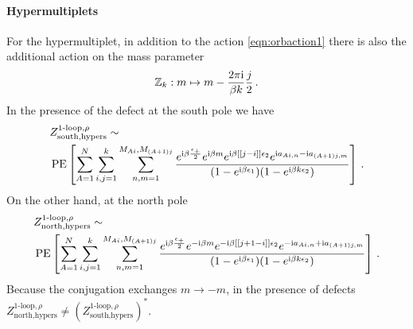 \documentclass[main.tex]{subfiles}
\begin{document}
\paragraph{Hypermultiplets} 
For the hypermultiplet, in addition to the action \eqref{eqn:orbaction1} there is also the additional action on the mass parameter 
\begin{equation}\label{eqn:massparamorbact}
\mathbb{Z}_k:m\mapsto m-\frac{2\pi\mathrm{i}}{\beta k}\frac{j}{2}\,.
\end{equation}
In the presence of the defect at the south pole we have
\begin{equation}
\begin{aligned}
&Z_{\text{south},\text{hypers}}^{\text{1-loop},\rho}\sim \\&\operatorname{\mathrm{PE}}\left[\sum_{A=1}^N\sum_{i,j=1}^k\sum_{n,m=1}^{M_{Ai},M_{(A+1)j}}\frac{e^{\mathrm{i}\beta\frac{\epsilon_+}{2}}e^{\mathrm{i}\beta m}e^{\mathrm{i}\beta[[j-i]] \epsilon_2}e^{\mathrm{i} a_{Ai,n}-\mathrm{i} a_{(A+1)j,m}}}{(1-e^{\mathrm{i}\beta\epsilon_1})(1-e^{\mathrm{i}\beta k\epsilon_2})}\right]\,.
\end{aligned}
\end{equation}
On the other hand, at the north pole
\begin{equation}
\begin{aligned}
&Z_{\text{north},\text{hypers}}^{\text{1-loop},\rho}\sim \\& \operatorname{\mathrm{PE}}\left[\sum_{A=1}^N\sum_{i,j=1}^k\sum_{n,m=1}^{M_{Ai},M_{(A+1)j}}\frac{e^{\mathrm{i}\beta\frac{\epsilon_+}{2}}e^{-\mathrm{i}\beta m}e^{-\mathrm{i}\beta[[j+1-i]] \epsilon_2}e^{-\mathrm{i} a_{Ai,n}+\mathrm{i} a_{(A+1)j,m}}}{(1-e^{\mathrm{i}\beta\epsilon_1})(1-e^{\mathrm{i}\beta k\epsilon_2})}\right]\,.
\end{aligned}
\end{equation}
Because the conjugation exchanges $m\to-m$, in the presence of defects \newline$Z_{\text{north},\text{hypers}}^{\text{1-loop},\rho}\neq \left(Z_{\text{south},\text{hypers}}^{\text{1-loop},\rho}\right)^*$.
\end{document}
